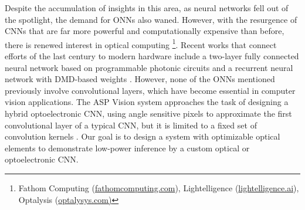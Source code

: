 Despite the accumulation of insights in this area, as neural networks fell out of the spotlight, the demand for ONNs also waned. However, with the resurgence of CNNs that are far more powerful and computationally expensive than before, there is renewed interest in optical computing \footnote{Fathom Computing (\url{fathomcomputing.com}), Lightelligence (\url{lightelligence.ai}), Optalysis (\url{optalysys.com)}}. Recent works that connect efforts of the last century to modern hardware include a two-layer fully connected neural network based on programmable photonic circuits \cite{shen2017deep} and  a recurrent neural network with DMD-based weights \cite{bueno2017reinforcement}. However, none of the ONNs mentioned previously involve convolutional layers, which have become essential in computer vision applications. The ASP Vision system approaches the task of designing a hybrid optoelectronic CNN, using angle sensitive pixels to approximate the first convolutional layer of a typical CNN, but it is limited to a fixed set of convolution kernels \cite{chen2016asp}. Our goal is to design a system with optimizable optical elements to demonstrate low-power inference by a custom optical or optoelectronic CNN.

